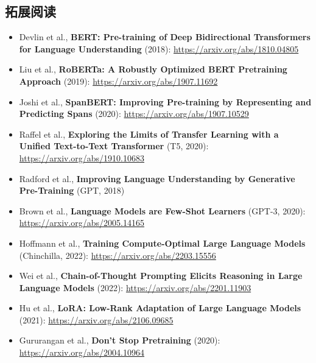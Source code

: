 \documentclass[a4paper]{article}
\begin{document}
\subsection{拓展阅读}

\begin{itemize}
    \item Devlin et al., \textbf{BERT: Pre-training of Deep Bidirectional Transformers for Language Understanding} (2018): \url{https://arxiv.org/abs/1810.04805}
    \item Liu et al., \textbf{RoBERTa: A Robustly Optimized BERT Pretraining Approach} (2019): \url{https://arxiv.org/abs/1907.11692}
    \item Joshi et al., \textbf{SpanBERT: Improving Pre-training by Representing and Predicting Spans} (2020): \url{https://arxiv.org/abs/1907.10529}
    \item Raffel et al., \textbf{Exploring the Limits of Transfer Learning with a Unified Text-to-Text Transformer} (T5, 2020): \url{https://arxiv.org/abs/1910.10683}
    \item Radford et al., \textbf{Improving Language Understanding by Generative Pre-Training} (GPT, 2018)
    \item Brown et al., \textbf{Language Models are Few-Shot Learners} (GPT-3, 2020): \url{https://arxiv.org/abs/2005.14165}
    \item Hoffmann et al., \textbf{Training Compute-Optimal Large Language Models} (Chinchilla, 2022): \url{https://arxiv.org/abs/2203.15556}
    \item Wei et al., \textbf{Chain-of-Thought Prompting Elicits Reasoning in Large Language Models} (2022): \url{https://arxiv.org/abs/2201.11903}
    \item Hu et al., \textbf{LoRA: Low-Rank Adaptation of Large Language Models} (2021): \url{https://arxiv.org/abs/2106.09685}
    \item Gururangan et al., \textbf{Don't Stop Pretraining} (2020): \url{https://arxiv.org/abs/2004.10964}
\end{itemize}
\end{document}
